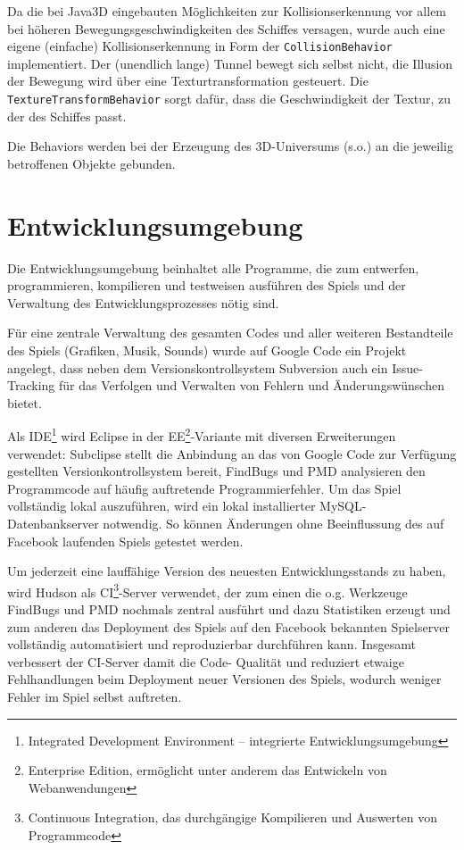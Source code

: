 \documentclass[a4paper,12pt]{scrartcl}
\begin{document}
Da die bei Java3D eingebauten Möglichkeiten zur Kollisionserkennung vor allem bei
höheren Bewegungsgeschwindigkeiten des Schiffes versagen, wurde auch eine eigene
(einfache) Kollisionserkennung in Form der \texttt{CollisionBehavior}
implementiert. Der (unendlich lange) Tunnel bewegt sich selbst nicht, die Illusion der Bewegung wird über eine
Texturtransformation gesteuert. Die \texttt{TextureTransformBehavior} sorgt
dafür, dass die Geschwindigkeit der Textur, zu der des Schiffes passt.

Die Behaviors werden bei der Erzeugung des 3D-Universums (s.o.) an die jeweilig
betroffenen Objekte gebunden.

\section{Entwicklungsumgebung}
Die Entwicklungsumgebung beinhaltet alle Programme, die zum entwerfen,
programmieren, kompilieren und testweisen ausführen des Spiels und der Verwaltung des
Entwicklungsprozesses nötig sind.

Für eine zentrale Verwaltung des gesamten Codes und aller weiteren Bestandteile des
Spiels (Grafiken, Musik, Sounds) wurde auf Google Code ein Projekt angelegt, dass neben
dem Versionskontrollsystem Subversion auch ein Issue-Tracking für das Verfolgen und
Verwalten von Fehlern und Änderungswünschen bietet.

Als IDE\footnote{Integrated Development Environment -- integrierte
Entwicklungsumgebung} wird Eclipse in der EE\footnote{Enterprise
Edition, ermöglicht unter anderem das Entwickeln von Webanwendungen}-Variante
mit diversen Erweiterungen verwendet: Subclipse stellt die Anbindung an das von Google Code zur Verfügung gestellten Versionkontrollsystem bereit, FindBugs und PMD analysieren den Programmcode auf häufig auftretende Programmierfehler.
Um das Spiel vollständig lokal auszuführen, wird ein lokal installierter MySQL-
Datenbankserver notwendig. So können Änderungen ohne Beeinflussung des auf Facebook
laufenden Spiels getestet werden.

Um jederzeit eine lauffähige Version des neuesten Entwicklungsstands zu haben, wird
Hudson als CI\footnote{Continuous Integration, das durchgängige Kompilieren und Auswerten von Programmcode}-Server verwendet, der zum einen die o.g. Werkzeuge FindBugs
und PMD nochmals zentral ausführt und dazu Statistiken erzeugt und zum anderen das
Deployment des Spiels auf den Facebook bekannten Spielserver vollständig automatisiert
und reproduzierbar durchführen kann. Insgesamt verbessert der CI-Server damit die Code-
Qualität und reduziert etwaige Fehlhandlungen beim Deployment neuer Versionen des
Spiels, wodurch weniger Fehler im Spiel selbst auftreten.
\end{document}
